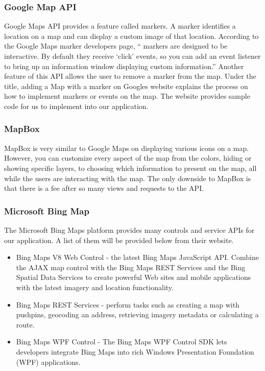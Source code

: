 \documentclass[onecolumn, draftclsnofoot,10pt, compsoc]{IEEEtran}
\begin{document}
\subsubsection{Google Map API}
Google Maps API provides a feature called markers. A marker identifies a location on a map and can display a custom image of that location. According to the Google Maps marker developers page, “ markers are designed to be interactive. By default they receive ‘click’ events, so you can add an event listener to bring up an information window displaying custom information.” Another feature of this API allows the user to remove a marker from the map. Under the title, adding a Map with a marker on Googles website explains the process on how to implement markers or events on the map. The website provides sample code for us to implement into our application. \cite{GoogleMap}\\
 
\subsubsection{MapBox}
MapBox is very similar to Google Maps on displaying various icons on a map. However, you can customize every aspect of the map from the colors, hiding or showing specific layers, to choosing which information to present on the map, all while the users are interacting with the map. The only downside to MapBox is that there is a fee after so many views and requests to the API. \cite{Mapbox}\\

\subsubsection{Microsoft Bing Map}
The Microsoft Bing Maps platform provides many controls and service APIs for our application. A list of them will be provided below from their website.

\begin{itemize}
\item Bing Maps V8 Web Control - the latest Bing Maps JavaScript API. Combine the AJAX map control with the Bing Maps REST Services and the Bing Spatial Data Services to create powerful Web sites and mobile applications with the latest imagery and location functionality.\cite{bing}
\item Bing Maps REST Services - perform tasks such as creating a map with pushpins, geocoding an address, retrieving imagery metadata or calculating a route.\cite{bing}
\item Bing Maps WPF Control - The Bing Maps WPF Control SDK lets developers integrate Bing Maps into rich Windows Presentation Foundation (WPF) applications.\cite{bing}
\end{itemize}
\end{document}
